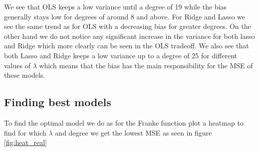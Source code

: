 \documentclass[12pt]{article}
\begin{document}
We see that OLS keeps a low variance until a degree of 19 while the bias generally stays low for degrees of around 8 and above. For Ridge and Lasso we see the same trend as for OLS with a decreasing bias for greater degrees. On the other hand we do not notice any significant increase in the variance for both lasso and Ridge which more clearly can be seen in the OLS tradeoff. We also see that both Lasso and Ridge keeps a low variance up to a degree of 25 for different values of $\lambda$ which means that the bias has the main responsibility for the MSE of these models.

\subsection{Finding best models}
To find the optimal model we do as for the Franke function plot a heatmap to find for which $\lambda$ and degree we get the lowest MSE as seen in figure \ref{fig:heat_real}
\end{document}
